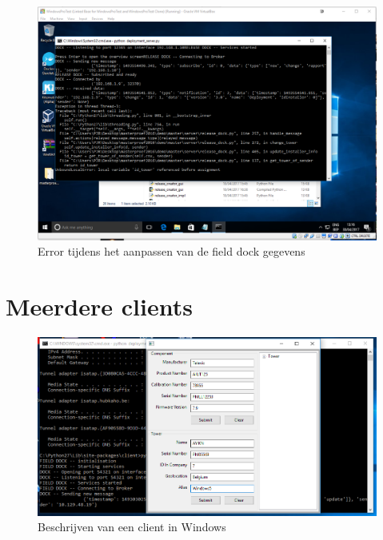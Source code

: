 \begin{figure}
\centering
\includegraphics[width=\textwidth,height=\textheight,keepaspectratio]{afbeelding/testMultiServer/installatie.png}
\caption{Error tijdens het aanpassen van de field dock gegevens}
\label{fig:testServer:installation}
\end{figure}

\clearpage
\section{Meerdere clients}\label{sec:multiclientscreen}
\begin{figure}
\centering
\includegraphics[width=\textwidth,height=\textheight,keepaspectratio]{afbeelding/testMultiClient/TorenBeschrijvenWindows.png}
\caption{Beschrijven van een client in Windows}
\label{fig:testClient:windowsBeschrijving}
\end{figure}

